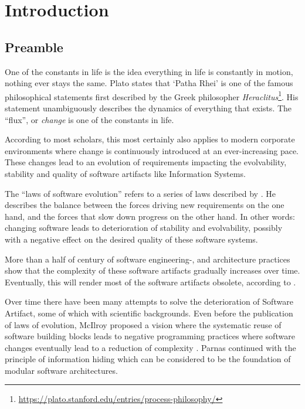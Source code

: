 \chapter{Introduction} \label{introduction}

\section{Preamble} \label{sec:preamble}

One of the constants in life is the idea everything in life is constantly in motion,
nothing ever stays the same. Plato states that \enquote*{Patha Rhei} is one of the famous
philosophical statements first described by the Greek philosopher
\emph{Heraclitus}\footnote{\url{https://plato.stanford.edu/entries/process-philosophy/}}.
His statement unambiguously describes the dynamics of everything that exists. The
\enquote{flux}, or \emph{change} is one of the constants in life. 

According to most scholars, this most certainly also applies to modern corporate
environments where change is continuously introduced at an ever-increasing pace. These
changes lead to an evolution of requirements impacting the evolvability, stability and
quality of software artifacts like Information Systems.

The \enquote{laws of software evolution} \parencite[]{lehman_programs_1980} refers to a
series of laws described by \citeauthor{lehman_programs_1980}. He describes the balance
between the forces driving new requirements on the one hand, and the forces that slow down
progress on the other hand. In other words: changing software leads to deterioration of
stability and evolvability, possibly with a negative effect on the desired quality
of these software systems. 

More than a half of century of software engineering-, and architecture practices show that
the complexity of these software artifacts gradually increases over time. Eventually, this
will render most of the software artifacts obsolete, according to
\citeauthor{lehman_programs_1980} \parencite[]{lehman_programs_1980}.

Over time there have been many attempts to solve the deterioration of Software Artifact,
some of which with scientific backgrounds. Even before the publication of
\citeauthor{lehman_programs_1980} laws of evolution, McIlroy proposed a vision where the
systematic reuse of software building blocks leads to negative programming practices where
software changes eventually lead to a reduction of complexity
\parencite*{p_naur_nato_1968}. Parnas continued with the principle of information hiding
which can be considered to be the foundation of modular software architectures.

